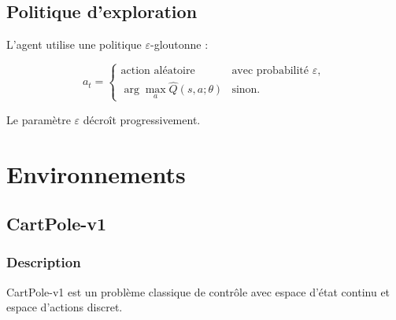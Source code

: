 \documentclass[12pt,a4paper]{article}
\begin{document}
\subsection{Politique d'exploration}

L'agent utilise une politique $\varepsilon$-gloutonne :

\[
a_t =
\begin{cases}
\text{action aléatoire} & \text{avec probabilité } \varepsilon, \\
\arg\max_a \hat{Q}(s,a;\theta) & \text{sinon}.
\end{cases}
\]

Le paramètre $\varepsilon$ décroît progressivement.

\section{Environnements}

\subsection{CartPole-v1}

\subsubsection{Description}

CartPole-v1 est un problème classique de contrôle avec espace d'état continu et espace d'actions discret.
\end{document}
